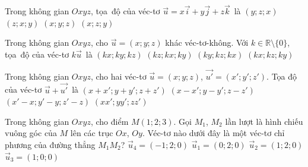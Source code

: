 

\begin{ex}%
	Trong không gian $Oxyz$,  tọa~độ của véc-tơ $\overrightarrow{u}=x \overrightarrow{i}+y \overrightarrow{j}+z \overrightarrow{k}$~là
	 \choice
		{$(y;  z; x)$}
		{$(z; x;  y)$}
		{\True $(x; y; z)$} 
		{$(x;  z; y)$}
\end{ex}

\begin{ex}%
	Trong không gian $Oxyz$, cho $\overrightarrow{u}=(x;  y; z)$ khác véc-tơ-không.\xuongdong
	Với $k \in \mathbb{R} \setminus\{0\}$, tọa~độ  của véc-tơ $k \overrightarrow{u}$~là
	\choice 
		{\True $(kx; ky; kz)$} 
		{$(kz;  kx; ky)$}
		{$(ky; kz; kx)$} 
		{$(kx;  kz; ky)$}
\end{ex}

\begin{ex}%
	Trong không gian $Oxyz$, cho hai véc-tơ $\overrightarrow{u}=(x; y; z)$, $\overrightarrow{u'}=\left(x';  y'; z'\right)$. Tọa độ của véc-tơ $\overrightarrow{u}+\overrightarrow{u'}$~là
	\choice 
		 {\True $\left(x+x'; y+y'; z+z'\right)$}
		{$\left(x-x'; y-y';  z-z'\right)$}
		{$\left(x'-x;  y'-y; z'-z\right)$}
		{$\left(x  x'; yy'; zz'\right)$}
\end{ex}

\begin{ex}%
	Trong không gian $Oxyz$,  cho điểm $M(1;2;3)$. Gọi $M_1$, $M_2$ lần lượt là hình chiếu vuông góc của $M$ lên các trục $Ox$, $Oy$. Véc-tơ nào dưới đây là một véc-tơ chỉ phương của đường thẳng $M_1M_2$?
	\choice 
		{\True  $\overrightarrow{u}_4=(-1;2;0)$}
		 {$\overrightarrow{u}_1=(0;2;0)$}
		{$\overrightarrow{u}_2=(1;2;0)$} 
		 {$\overrightarrow{u}_3=(1;0;0)$}
\end{ex}

